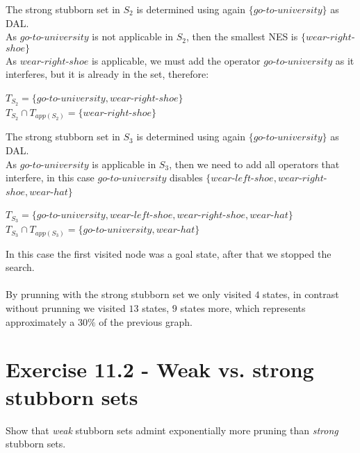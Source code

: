 \documentclass[11pt,a4paper]{article}
\begin{document}
The strong stubborn set in $S_2$ is determined using again $\{go$-$to$-$university\}$ as DAL.\\
As $go$-$to$-$university$ is not applicable in $S_2$, then the smallest NES is $\{wear$-$right$-$shoe\}$\\
As $wear$-$right$-$shoe$ is applicable, we must add the operator $go$-$to$-$university$ as it interferes,  but it is already in the set, therefore:
\begin{center}
	$T_{S_2} = \{go$-$to$-$university, wear$-$right$-$shoe\}$\\
	$T_{S_2} \cap T_{app(S_2)} = \{wear$-$right$-$shoe\}$
\end{center}

The strong stubborn set in $S_3$ is determined using again $\{go$-$to$-$university\}$ as DAL.\\
As $go$-$to$-$university$ is applicable in $S_3$, then we need to add all operators that interfere, in this case $go$-$to$-$university$ disables $\{wear$-$left$-$shoe, wear$-$right$-$shoe, wear$-$hat\}$
\begin{center}
	$T_{S_3} = \{go$-$to$-$university, wear$-$left$-$shoe, wear$-$right$-$shoe, wear$-$hat\}$\\
	$T_{S_3} \cap T_{app(S_3)} = \{go$-$to$-$university, wear$-$hat\}$
\end{center}
In this case the first visited node was a goal state, after that we stopped the search.\\\\
By prunning with the strong stubborn set we only visited $4$ states, in contrast without prunning we visited $13$ states, $9$ states more, which represents approximately a $30\%$ of the previous graph.
\section*{Exercise 11.2 - Weak vs. strong stubborn sets}
Show that \emph{weak} stubborn sets admint exponentially more pruning than
\emph{strong} stubborn sets.\\
\end{document}
